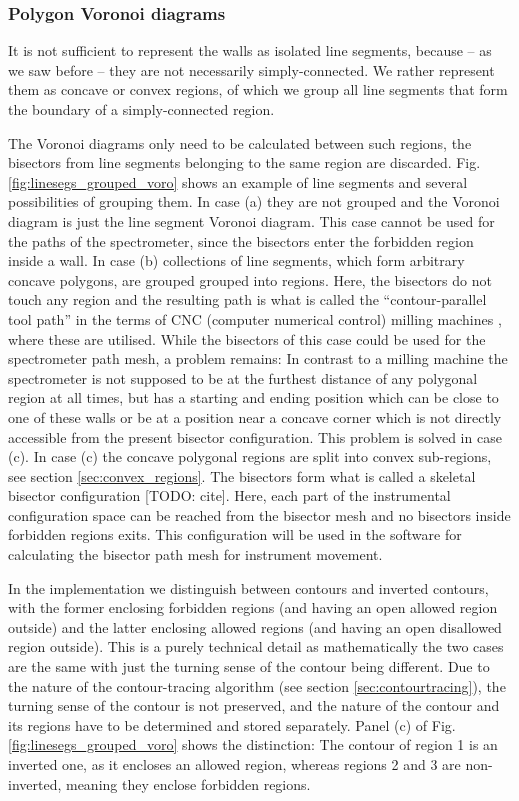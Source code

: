 \subsubsection*{Polygon Voronoi diagrams}

It is not sufficient to represent the walls as isolated line segments, because -- 
as we saw before -- they are not necessarily simply-connected. 
We rather represent them as concave or convex regions, of which we group all 
line segments that form the boundary of a simply-connected region.

The Voronoi diagrams only need to be calculated between such regions, 
the bisectors from line segments belonging to the same region are discarded. 
Fig. \ref{fig:linesegs_grouped_voro} shows an example of line segments and several
possibilities of grouping them. 
In case (a) they are not grouped and the Voronoi diagram is just the line 
segment Voronoi diagram. This case cannot be used for the paths of the spectrometer,
since the bisectors enter the forbidden region inside a wall.
In case (b) collections of line segments, which form arbitrary concave polygons, 
are grouped grouped into regions. Here, the bisectors do not touch any region 
and the resulting path is what is called the ``contour-parallel tool path'' in 
the terms of CNC (computer numerical control) milling machines \cite{Jeong1998, wiki_milling}, where these are utilised. While the bisectors of this case could 
be used for the spectrometer path mesh, a problem remains: In contrast to a milling
machine the spectrometer is not supposed to be at the furthest distance of any
polygonal region at all times, but has a starting and ending position which can 
be close to one of these walls or be at a position near a concave corner which
is not directly accessible from the present bisector configuration. This problem
is solved in case (c).
In case (c) the concave polygonal regions are split into convex sub-regions, see
section \ref{sec:convex_regions}.
The bisectors form what is called a skeletal bisector configuration [TODO: cite].
Here, each part of the instrumental configuration space can be reached from the
bisector mesh and no bisectors inside forbidden regions exits. This configuration
will be used in the software for calculating the bisector path mesh for instrument
movement.

In the implementation we distinguish between contours and inverted contours, with 
the former enclosing forbidden regions (and having an open allowed region outside) 
and the latter enclosing allowed regions (and having an open disallowed region outside).
This is a purely technical detail as mathematically the two cases are the same
with just the turning sense of the contour being different. 
Due to the nature of the contour-tracing algorithm (see section \ref{sec:contourtracing}), 
the turning sense of the contour is not preserved, and the nature of the contour 
and its regions have to be determined and stored separately.
Panel (c) of Fig. \ref{fig:linesegs_grouped_voro} shows the distinction: 
The contour of region 1 is an inverted one, as it encloses an allowed region,
whereas regions 2 and 3 are non-inverted, meaning they enclose forbidden regions.

